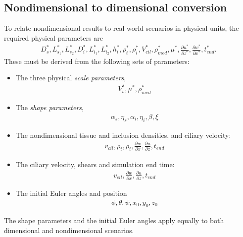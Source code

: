 \documentclass[10pt,a4paper]{article}
\def\non{\nonumber}
\def\p{\partial}
\begin{document}
\subsection{Nondimensional to dimensional conversion}
To relate nondimensional results to real-world scenarios in physical units, the required physical parameters are
\begin{eqnarray}\label{nd2dpars0}
	D^*_s, L^*_{s_1}, L^*_{s_2}, D^*_{i}, L^*_{i_1}, L^*_{i_2}, h^*_i, \rho^*_t, \rho^*_{i}, V^*_{cil}, \rho^*_{med}, \mu^*, \frac{\p u^*}{\p z^*}, \frac{\p w^*}{\p x^*}, t^*_{end}.
\end{eqnarray}
These must be derived from the following sets of parameters:
\begin{itemize}
	\item The three physical \textit{scale parameters},
		\begin{eqnarray}\label{nd2dpars0a}
			V_t^*, \mu^*, \rho^*_{med}	
		\end{eqnarray}
	\item The \textit{shape parameters}, 
		\begin{eqnarray}\label{nd2dpars2}
			\alpha_s, \eta_s, \alpha_{i}, \eta_{i}, \beta, \xi
		\end{eqnarray}
	\item The nondimensional tissue and inclusion densities, and ciliary velocity:
		\begin{eqnarray}\label{nd2dpars1a}
			v_{cil}, \rho_t, \rho_i, \frac{\p w}{\p x}, \frac{\p u}{\p z}, t_{end}
		\end{eqnarray}
	\item The ciliary velocity, shears and simulation end time:
		\begin{eqnarray}\label{nd2dpars1b}
			v_{cil}, \frac{\p w}{\p x}, \frac{\p u}{\p z}, t_{end}
		\end{eqnarray}
	\item The initial Euler angles and position
		\begin{eqnarray}\label{nd2dpars2a}
			\phi, \theta, \psi, x_0, y_0, z_0
		\end{eqnarray}	 	
\end{itemize}
The shape parameters and the initial Euler angles apply equally to both dimensional and nondimensional scenarios.
\end{document}
